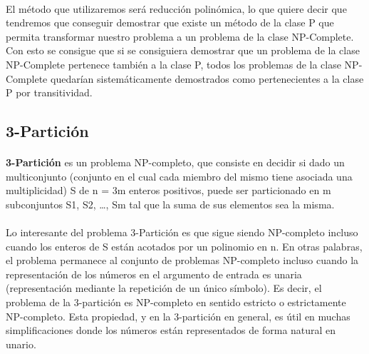 \documentclass[11pt, a4paper,spanish]{article}
\begin{document}
			\paragraph{}
			El método que utilizaremos será reducción polinómica, lo que quiere decir que tendremos que conseguir demostrar que existe un método de la clase P que permita transformar nuestro problema a un problema de la clase NP-Complete. Con esto se consigue que si se consiguiera demostrar que un problema de la clase NP-Complete pertenece también a la clase P, todos los problemas de la clase NP-Complete quedarían sistemáticamente demostrados como pertenecientes a la clase P por transitividad.
			
			
			\subsection{3-Partición}

				\paragraph{}
				{\bf 3-Partición} es un problema NP-completo, que consiste en decidir si dado un multiconjunto  (conjunto en el cual cada miembro del mismo tiene asociada una multiplicidad) S de n = 3m enteros positivos, puede ser particionado en m subconjuntos S1, S2, …, Sm tal que la suma de sus elementos sea la misma.
			
				\paragraph{}
				Lo interesante del problema 3-Partición es que sigue siendo NP-completo incluso cuando los enteros de S están acotados por un polinomio en n. En otras palabras, el problema permanece al conjunto de problemas NP-completo incluso cuando la representación de los números en el argumento de entrada es unaria (representación mediante la repetición de un único símbolo). Es decir, el problema de la 3-partición es NP-completo en sentido estricto o estrictamente NP-completo. Esta propiedad, y en la 3-partición en general, es útil en muchas simplificaciones donde los números están representados de forma natural en unario.
	
\end{document}
